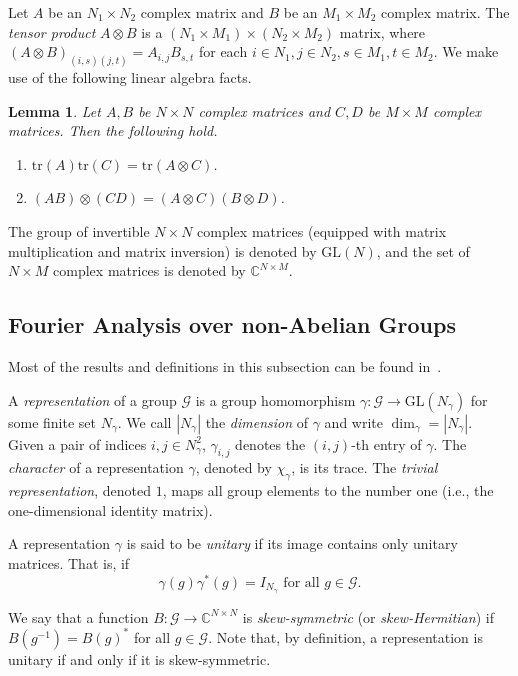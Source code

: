 \documentclass[a4paper,11pt]{article}
\newtheorem{lemma}[theorem]{Lemma}
\theoremstyle{definition}
\newcommand{\cc}{\mathbb{C}}
\newcommand{\gr}{\mathscr{G}}
\newcommand{\GL}{\mathrm{GL}}
\newcommand{\tr}{\mathrm{tr}}
\newcommand{\triv}{1}
\begin{document}
Let $A$ be an $N_1\times N_2$ complex matrix and $B$ be an $M_1\times M_2$ complex matrix. The \emph{tensor product} $A\otimes B$ is a $(N_1\times M_1) \times (N_2\times M_2)$ matrix, where
$(A\otimes B)_{(i,s)(j,t)}=A_{i,j}B_{s,t}$
for each $i\in N_1,j\in N_2, s\in M_1, t\in M_2$. 
We make use of the following linear algebra facts.

\begin{lemma}
    Let $A,B$ be $N\times N$ complex matrices and $C,D$ be $M\times M$ complex matrices. Then the following hold.
    \begin{enumerate}
        \item       $\tr(A)\tr(C)=\tr(A\otimes C)$.
        \item 
        $(AB) \otimes (CD) = 
        (A\otimes C) (B \otimes D)$.
    \end{enumerate}
\end{lemma}

The group of invertible $N
\times N$ complex matrices (equipped with matrix multiplication and matrix inversion) is denoted by $\GL(N)$, and the set of $N\times M$
complex matrices is denoted by $\cc^{N\times M}$.



\subsection{Fourier Analysis over non-Abelian Groups}
Most of the results and definitions in this subsection can be found in~\cite{Terras_1999}. \par
A \emph{representation} of a group $\gr$  is a group homomorphism 
$\gamma: \gr \to \GL(N_\gamma)$ for some finite set $N_\gamma$. We call $|N_\gamma|$ the \emph{dimension} of $\gamma$ and write $\dim_\gamma=|N_\gamma|$.
Given a pair of indices $i,j\in N_\gamma^2$, $\gamma_{i,j}$ denotes the $(i,j)$-th entry of $\gamma$. 
The \emph{character} of a representation $\gamma$, denoted by $\chi_\gamma$, is its trace. The \emph{trivial representation}, denoted $\triv$, maps all group elements to the number one (i.e., the one-dimensional identity matrix). 
\par

A representation $\gamma$ is said to be \emph{unitary} if its image contains only unitary matrices. That is, if 
\[
   \gamma(g)\gamma^*(g) = I_{N_\gamma} \text{ for all $g\in \gr$.}
\]

 
We say that a function $B: \gr \to \mathbb{C}^{N \times N}$ is \emph{skew-symmetric} (or \emph{skew-Hermitian}) if $B(g^{-1})=B(g)^*$ for all $g\in\gr$. Note that, by definition, a representation is unitary if and only if it is skew-symmetric.
\end{document}
